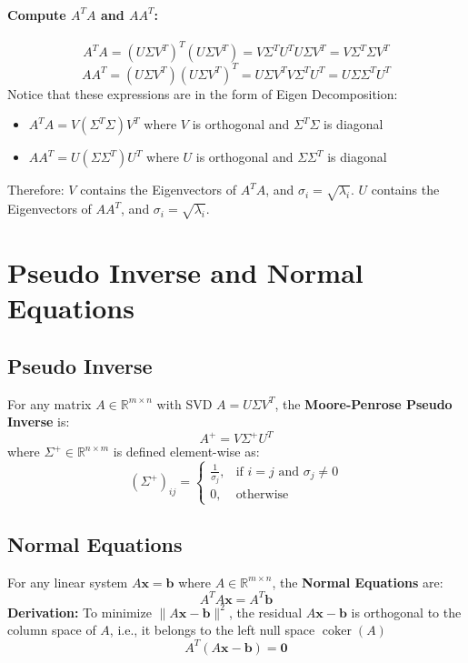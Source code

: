 \documentclass{article}
\begin{document}
\paragraph{Compute $A^T A$ and $AA^T$:}
\[
    A^T A = (U \Sigma V^T)^T (U \Sigma V^T) = V \Sigma^T U^T U \Sigma V^T = V \Sigma^T \Sigma V^T
\]
\[
    AA^T = (U \Sigma V^T)(U \Sigma V^T)^T = U \Sigma V^T V \Sigma^T U^T = U \Sigma \Sigma^T U^T
\]
Notice that these expressions are in the form of Eigen Decomposition:
\begin{itemize}
    \item $A^T A = V (\Sigma^T \Sigma) V^T$ where $V$ is orthogonal and $\Sigma^T \Sigma$ is diagonal
    \item $AA^T = U (\Sigma \Sigma^T) U^T$ where $U$ is orthogonal and $\Sigma \Sigma^T$ is diagonal
\end{itemize}
Therefore: $V$ contains the Eigenvectors of $A^T A$, and $\sigma_i = \sqrt{\lambda_i}$. $U$ contains the Eigenvectors of $AA^T$, and $\sigma_i = \sqrt{\lambda_i}$.


\newpage
\section{Pseudo Inverse and Normal Equations}

\subsection{Pseudo Inverse}

For any matrix $A \in \mathbb{R}^{m \times n}$ with SVD $A = U \Sigma V^T$, the \textbf{Moore-Penrose Pseudo Inverse} is:
\[
    A^+ = V \Sigma^+ U^T
\]
where $\Sigma^+ \in \mathbb{R}^{n \times m}$ is defined element-wise as:
\[
    (\Sigma^+)_{ij} =
    \begin{cases}
        \frac{1}{\sigma_j}, & \text{if } i = j \text{ and } \sigma_j \neq 0 \\
        0, & \text{otherwise}
    \end{cases}
\]

\subsection{Normal Equations}

For any linear system $A\mathbf{x} = \mathbf{b}$ where $A \in \mathbb{R}^{m \times n}$, the \textbf{Normal Equations} are:
\[
    A^T A \mathbf{x} = A^T \mathbf{b}
\]
\textbf{Derivation:} To minimize $\|A\mathbf{x} - \mathbf{b}\|^2$, the residual $A\mathbf{x} - \mathbf{b}$ is orthogonal to the column space of $A$, i.e., it belongs to the left null space $\operatorname{coker}(A)$
\[
    A^T(A\mathbf{x} - \mathbf{b}) = \mathbf{0}
\]
\end{document}

